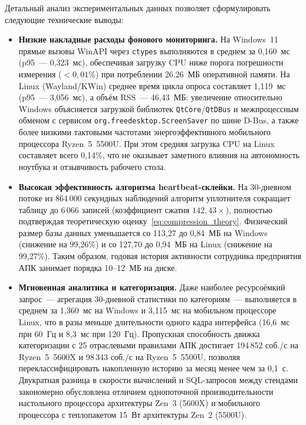 \documentclass{timcw}
\begin{document}
Детальный анализ экспериментальных данных позволяет сформулировать следующие технические выводы:
\begin{itemize}
  \item \textbf{Низкие накладные расходы фонового мониторинга.} На Windows~11 прямые вызовы WinAPI через \texttt{ctypes} выполняются в среднем за 0{,}160~мс (p95~--- 0{,}323~мс), обеспечивая загрузку CPU ниже порога погрешности измерения ($<0{,}01\%$) при потреблении 26{,}26~МБ оперативной памяти. На Linux (Wayland/KWin) среднее время цикла опроса составляет 1{,}119~мс (p95~--- 3{,}056~мс), а объём RSS~--- 46{,}43~МБ: увеличение относительно Windows объясняется загрузкой библиотек \texttt{QtCore}/\texttt{QtDBus} и межпроцессным обменом с сервисом \texttt{org.freedesktop.ScreenSaver} по шине D-Bus, а также более низкими тактовыми частотами энергоэффективного мобильного процессора Ryzen~5~5500U. При этом средняя загрузка CPU на Linux составляет всего 0{,}14\%, что не оказывает заметного влияния на автономность ноутбука и отзывчивость рабочего стола.
  \item \textbf{Высокая эффективность алгоритма heartbeat-склейки.} На 30-дневном потоке из 864\,000 секундных наблюдений алгоритм уплотнителя сокращает таблицу до 6\,066 записей (коэффициент сжатия $142{,}43\times$), полностью подтверждая теоретическую оценку~\eqref{eq:compression_theory}. Физический размер базы данных уменьшается со 113{,}27 до 0{,}84~МБ на Windows (снижение на 99{,}26\%) и со 127{,}70 до 0{,}94~МБ на Linux (снижение на 99{,}27\%). Таким образом, годовая история активности сотрудника предприятия АПК занимает порядка 10--12~МБ на диске.
  \item \textbf{Мгновенная аналитика и категоризация.} Даже наиболее ресурсоёмкий запрос~--- агрегация 30-дневной статистики по категориям~--- выполняется в среднем за 1{,}360~мс на Windows и 3{,}115~мс на мобильном процессоре Linux, что в разы меньше длительности одного кадра интерфейса (16{,}6~мс при 60~Гц и 8{,}3~мс при 120~Гц). Пропускная способность движка категоризации с 25 отраслевыми правилами АПК достигает 194\,852 соб./с на Ryzen~5~5600X и 98\,343 соб./с на Ryzen~5~5500U, позволяя переклассифицировать накопленную историю за месяц менее чем за 0{,}1~с. Двукратная разница в скорости вычислений и SQL-запросов между стендами закономерно обусловлена отличием однопоточной производительности настольного процессора архитектуры Zen~3 (5600X) и мобильного процессора с теплопакетом 15~Вт архитектуры Zen~2 (5500U).
\end{itemize}
\end{document}
